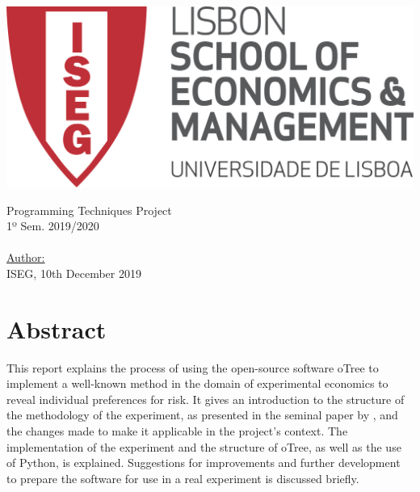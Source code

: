 \documentclass [12pt,a4paper,oneside]{article}
\begin{document}

\makeatletter
\begin{titlepage}

\pagestyle{empty}
\centering

\begin{flushleft}
    \includegraphics[width=0.3\linewidth]{graphics/Logotipo_ISEG.png}
\end{flushleft}    
    \vspace{3cm}
   {\textsf{\Huge Programming Techniques Project}} \\ [1cm]
    {\textsf{\Large 1º Sem. 2019/2020}} \\ [3cm]
  {\textsf{\Large \@title }} \\ [2cm] %
\textsf{
\underline{Author:} \\
\@author}
    \vfill
    {\textsf{\Large ISEG, 10th  December 2019}}  %
 \clearpage 
 \end{titlepage}


 \newpage
 \thispagestyle{plain}
 \section*{Abstract}
 This report explains the process of using the open-source software oTree to implement a well-known method in the domain of experimental economics to reveal individual preferences for risk. It gives an introduction to the structure of the methodology of the experiment, as presented in the seminal paper by \textcite{holt_risk_2002}, and the changes made to make it applicable in the project's context. The implementation of the experiment and the structure of oTree, as well as the use of Python, is explained. Suggestions for improvements and further development to prepare the software for use in a real experiment is discussed briefly. 
 \\
 \\
\end{document}
